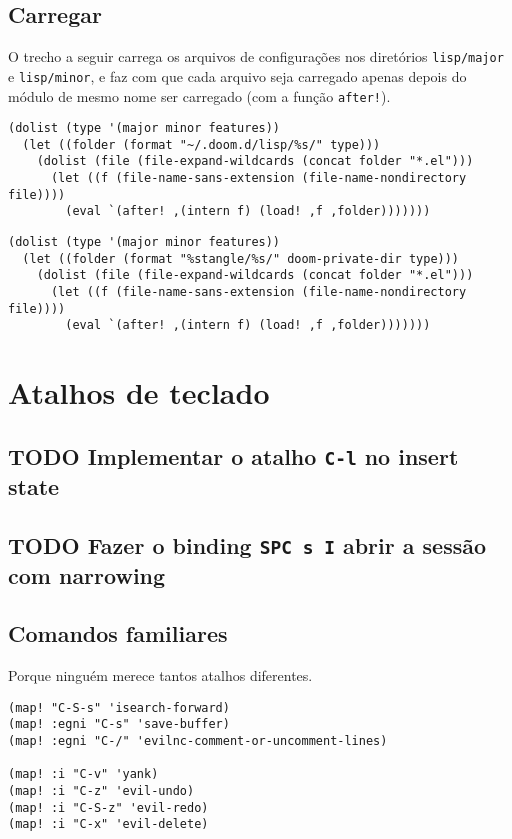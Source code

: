\documentclass[11pt]{article}
\begin{document}
\subsection{Carregar}
\label{sec:org3e6c555}
O trecho a seguir carrega os arquivos de configurações nos diretórios
\texttt{lisp/major} e \texttt{lisp/minor}, e faz com que cada arquivo seja carregado apenas
depois do módulo de mesmo nome ser carregado (com a função \texttt{after!}).
\begin{verbatim}
(dolist (type '(major minor features))
  (let ((folder (format "~/.doom.d/lisp/%s/" type)))
    (dolist (file (file-expand-wildcards (concat folder "*.el")))
      (let ((f (file-name-sans-extension (file-name-nondirectory file))))
        (eval `(after! ,(intern f) (load! ,f ,folder)))))))
\end{verbatim}

\begin{verbatim}
(dolist (type '(major minor features))
  (let ((folder (format "%stangle/%s/" doom-private-dir type)))
    (dolist (file (file-expand-wildcards (concat folder "*.el")))
      (let ((f (file-name-sans-extension (file-name-nondirectory file))))
        (eval `(after! ,(intern f) (load! ,f ,folder)))))))
\end{verbatim}

\section{Atalhos de teclado}
\label{sec:orga0eb357}
\subsection{{\bfseries\sffamily TODO} Implementar o atalho \texttt{C-l} no insert state}
\label{sec:orgff3161d}
\subsection{{\bfseries\sffamily TODO} Fazer o binding \texttt{SPC s I} abrir a sessão com narrowing}
\label{sec:org5db83d0}


\subsection{Comandos familiares}
\label{sec:orgf0ce997}

Porque ninguém merece tantos atalhos diferentes.

\begin{verbatim}
(map! "C-S-s" 'isearch-forward)
(map! :egni "C-s" 'save-buffer)
(map! :egni "C-/" 'evilnc-comment-or-uncomment-lines)

(map! :i "C-v" 'yank)
(map! :i "C-z" 'evil-undo)
(map! :i "C-S-z" 'evil-redo)
(map! :i "C-x" 'evil-delete)
\end{verbatim}
\end{document}
